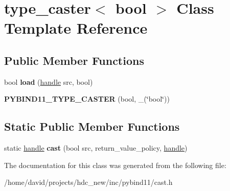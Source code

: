\hypertarget{classtype__caster_3_01bool_01_4}{}\section{type\+\_\+caster$<$ bool $>$ Class Template Reference}
\label{classtype__caster_3_01bool_01_4}
\subsection*{Public Member Functions}
\begin{DoxyCompactItemize}
\item 
bool {\bfseries load} (\hyperlink{classhandle}{handle} src, bool)\hypertarget{classtype__caster_3_01bool_01_4_aabecb6ffffdb85ed06795d3ff3778168}{}\label{classtype__caster_3_01bool_01_4_aabecb6ffffdb85ed06795d3ff3778168}

\item 
{\bfseries P\+Y\+B\+I\+N\+D11\+\_\+\+T\+Y\+P\+E\+\_\+\+C\+A\+S\+T\+ER} (bool, \+\_\+(\char`\"{}bool\char`\"{}))\hypertarget{classtype__caster_3_01bool_01_4_a0c24496979fb382a33a317d3d2e66aa6}{}\label{classtype__caster_3_01bool_01_4_a0c24496979fb382a33a317d3d2e66aa6}

\end{DoxyCompactItemize}
\subsection*{Static Public Member Functions}
\begin{DoxyCompactItemize}
\item 
static \hyperlink{classhandle}{handle} {\bfseries cast} (bool src, return\+\_\+value\+\_\+policy, \hyperlink{classhandle}{handle})\hypertarget{classtype__caster_3_01bool_01_4_ae5f7bb14916700a713abb0838346202d}{}\label{classtype__caster_3_01bool_01_4_ae5f7bb14916700a713abb0838346202d}

\end{DoxyCompactItemize}


The documentation for this class was generated from the following file\+:\begin{DoxyCompactItemize}
\item 
/home/david/projects/hdc\+\_\+new/inc/pybind11/cast.\+h\end{DoxyCompactItemize}
